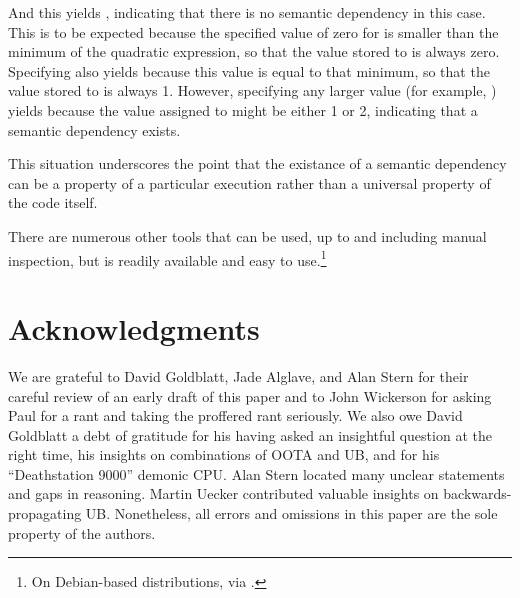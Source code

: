 \documentclass[10]{article}
\begin{document}
And this yields , indicating that there
is no semantic dependency in this case.
This is to be expected because the specified value of zero for 
is smaller than the minimum of the quadratic expression, so that the
value stored to  is always zero.
Specifying  also yields 
because this value is equal to that minimum, so that the value stored to
 is always 1.
However, specifying any larger value (for example, )
yields  because the value assigned to 
might be either 1 or 2, indicating that a semantic dependency exists.

This situation underscores the point that the existance of a semantic
dependency can be a property of a particular execution rather than a
universal property of the code itself.

There are numerous other tools that can be used, up to and including
manual inspection, but  is readily available and easy to
use.\footnote{
	On Debian-based distributions, via .}


\section{Acknowledgments}
\label{sec:Acknowledgments}

We are grateful to David Goldblatt, Jade Alglave, and Alan Stern for their
careful review of an early draft of this paper and to John Wickerson for
asking Paul for a rant and taking the proffered rant seriously.
We also owe David Goldblatt a debt of gratitude for his having asked an
insightful question at the right time, his insights on combinations of
OOTA and UB, and for his ``Deathstation 9000'' demonic CPU.
Alan Stern located many unclear statements and gaps in reasoning.
Martin Uecker contributed valuable insights on backwards-propagating UB.
Nonetheless, all errors and omissions in this paper are the sole property
of the authors.
\end{document}
